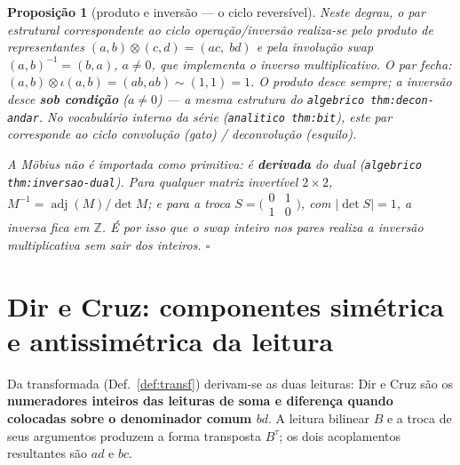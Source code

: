 \documentclass[11pt,a4paper]{article}
\newtheorem{proposicao}[teorema]{Proposição}
\newcommand{\code}[1]{\texttt{\small #1}}
\begin{document}
\begin{proposicao}[produto e inversão --- o ciclo reversível]\label{prop:conv}
Neste degrau, o par estrutural correspondente ao ciclo operação/inversão
realiza-se pelo produto de representantes $(a,b)\otimes(c,d) = (ac,\;bd)$
e pela involução swap $(a,b)^{-1} = (b,a)$, $a\neq 0$, que implementa o
inverso multiplicativo. O par fecha:
$(a,b)\otimes\iota(a,b)=(ab,ab)\sim(1,1)=1$.
O produto desce sempre; a inversão desce \textbf{sob condição}
($a\neq 0$) --- a mesma estrutura do
\code{algebrico thm:decon-andar}.
No vocabulário interno da série (\code{analitico thm:bit}), este par
corresponde ao ciclo convolução (gato) / deconvolução (esquilo).

A Möbius não é importada como primitiva: é \textbf{derivada} do dual
(\code{algebrico thm:inversao-dual}). Para qualquer matriz invertível
$2\times2$, $M^{-1}=\operatorname{adj}(M)/\det M$; e para a troca
$S=\bigl(\begin{smallmatrix}0&1\\1&0\end{smallmatrix}\bigr)$, com
$|\det S|=1$, a inversa fica em $\mathbb{Z}$. É por isso que o swap inteiro
nos pares realiza a inversão multiplicativa sem sair dos inteiros. $\square$
\end{proposicao}

\section{Dir e Cruz: componentes simétrica e antissimétrica da leitura}\label{sec:operacao}

Da transformada (Def.~\ref{def:transf}) derivam-se as duas leituras: Dir e
Cruz são os \textbf{numeradores inteiros das leituras de soma e diferença
quando colocadas sobre o denominador comum $bd$}. A leitura bilinear $B$ e a
troca de seus argumentos produzem a forma transposta $B^{\tau}$; os dois
acoplamentos resultantes são $ad$ e $bc$.
\end{document}
